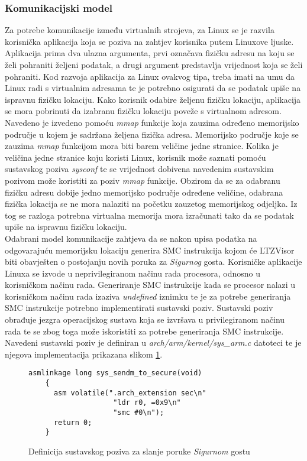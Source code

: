 \documentclass[times, utf8, diplomski, numeric]{fer}
\begin{document}
\subsubsection{Komunikacijski model}
Za potrebe komunikacije između virtualnih strojeva, za Linux se je razvila korisnička aplikacija koja se poziva na zahtjev
korisnika putem Linuxove ljuske. Aplikacija prima dva ulazna argumenta, prvi označava fizičku adresu na koju se želi
pohraniti željeni podatak, a drugi argument predstavlja vrijednost koja se želi pohraniti. Kod razvoja aplikacija za Linux
ovakvog tipa, treba imati na umu da Linux radi s virtualnim adresama te je potrebno osigurati da se podatak upiše na ispravnu
fizičku lokaciju. Kako korisnik odabire željenu fizičku lokaciju, aplikacija se mora pobrinuti da izabranu fizičku lokaciju
poveže s virtualnom adresom. Navedeno je izvedeno pomoću \textit{mmap} funkcije koja zauzima određeno memorijsko područje u
kojem je sadržana željena fizička adresa. Memorijsko područje koje se zauzima \textit{mmap} funkcijom mora biti barem
veličine jedne stranice. Kolika je veličina jedne stranice koju koristi Linux, korisnik može saznati pomoću sustavskog
poziva \textit{sysconf} te se vrijednost dobivena navedenim sustavskim pozivom može koristiti za poziv \textit{mmap}
funkcije. Obzirom da se za odabranu fizičku adresu dobije jedno memorijsko područje određene veličine, odabrana fizička
lokacija se ne mora nalaziti na početku zauzetog memorijskog odjeljka. Iz tog se razloga potrebna virtualna memorija mora
izračunati tako da se podatak upiše na ispravnu fizičku lokaciju.\\
Odabrani model komunikacije zahtjeva da se nakon upisa podatka na odgovarajuću memorijsku lokaciju generira SMC instrukcija
kojom će LTZVisor biti obavješten o postojanju novih poruka za \textit{Sigurnog} gosta. Korisničke aplikacije Linuxa
se izvode u neprivilegiranom načinu rada procesora, odnosno u korisničkom načinu rada. Generiranje SMC instrukcije kada
se procesor nalazi u korisničkom načinu rada izaziva \textit{undefined} iznimku te je za potrebe generiranja SMC
instrukcije potrebno implementirati sustavski poziv. Sustavski poziv obrađuje jezgra operacijskog sustava koja se izvršava
u privilegiranom načinu rada te se zbog toga može iskoristiti za potrebe generiranja SMC instrukcije. Navedeni sustavski
poziv je definiran u \textit{arch/arm/kernel/sys\_arm.c} datoteci te je njegova implementacija prikazana slikom \ref{sendm}.

\begin{figure}[H]
  \lstset{numbers=left, numbersep=2pt, numberstyle=\tiny, breaklines=true, xleftmargin=.1\textwidth}
  \begin{lstlisting}[showstringspaces=false]
    asmlinkage long sys_sendm_to_secure(void)
    {
      asm volatile(".arch_extension sec\n"
                    "ldr r0, =0x9\n"
                    "smc #0\n");
      return 0;
    }
  \end{lstlisting}
  \caption{Definicija sustavskog poziva za slanje poruke \textit{Sigurnom} gostu}
  \label{sendm}
\end{figure}
\end{document}
